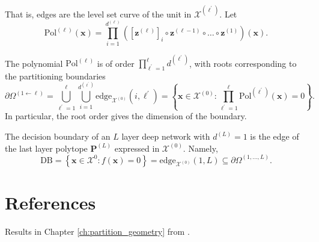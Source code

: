 That is, edges are the level set curve of the unit in $\mathcal{X}^{\left(\ell^\prime\right)}$. Let $$\mathrm{Pol}^{(\ell)}(\mathbf{x})=\prod_{i=1}^{d^{(\ell)}}\left(\left[\mathbf{z}^{(\ell)}\right]_i\circ\mathbf{z}^{(\ell-1)}\circ\dots\circ\mathbf{z}^{(1)}\right)(\mathbf{x}).$$

\begin{theorem}
    The polynomial $\mathrm{Pol}^{(\ell)}$ is of order $\prod_{\ell^\prime=1}^{\ell}d^{\left(\ell^\prime\right)}$, with roots corresponding to the partitioning boundaries $$\partial\Omega^{(1\leftarrow\ell)}=\bigcup_{\ell^\prime=1}^{\ell}\bigcup_{i=1}^{d^{\left(\ell^\prime\right)}}\mathrm{edge}_{\mathcal{X}^{(0)}}\left(i,\ell^\prime\right)=\left\{\mathbf{x}\in\mathcal{X}^{(0)}:\prod_{\ell^\prime=1}^{\ell}\mathrm{Pol}^{\left(\ell^\prime\right)}(\mathbf{x})=0\right\}.$$In particular, the root order gives the dimension of the boundary.
\end{theorem}

\begin{corollary}
    The decision boundary of an $L$ layer deep network with $d^{(L)}=1$ is the edge of the last layer polytope $\mathbf{P}^{(L)}$ expressed in $\mathcal{X}^{(0)}$. Namely, $$\mathrm{DB}=\left\{\mathbf{x}\in\mathcal{X}^0:f(\mathbf{x})=0\right\}=\mathrm{edge}_{\mathcal{X}^{(0)}}(1,L)\subseteq\partial\Omega^{(1,\dots,L)}.$$
\end{corollary}

\section{References}

Results in Chapter \ref{ch:partition_geometry} from \citet{balestrieroGeometryDeepNetworks2019}.